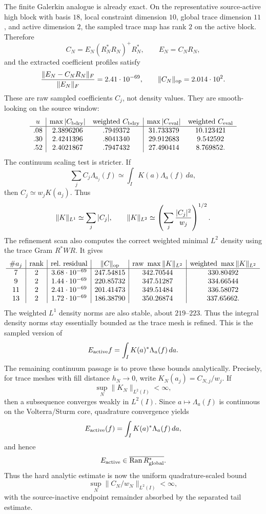 \documentclass[11pt]{article}
\begin{document}
The finite Galerkin analogue is already exact.  On the representative
source-active high block with basis \(18\), local constraint dimension \(10\),
global trace dimension \(11\), and active dimension \(2\), the sampled trace map
has rank \(2\) on the active block.  Therefore
\[
  C_N=E_N(R_N^\ast R_N)^+R_N^\ast,\qquad E_N=C_NR_N,
\]
and the extracted coefficient profiles satisfy
\[
  {\|E_N-C_NR_N\|_F\over\|E_N\|_F}=2.41\cdot10^{-69},
  \qquad \|C_N\|_{\rm op}=2.014\cdot10^2.
\]
These are raw sampled coefficients \(C_j\), not density values.  They are
smooth-looking on the source window:
\[
\begin{array}{c|cc|cc}
u&\max|C_{\rm bdry}|&{\rm weighted}\ C_{\rm bdry}
 &\max|C_{\rm eval}|&{\rm weighted}\ C_{\rm eval}\\\hline
.08&2.3896206&.7949372&31.733379&10.123421\\
.30&2.4241396&.8041340&29.912683& 9.542592\\
.52&2.4021867&.7947432&27.490414& 8.769852.
\end{array}
\]
The continuum scaling test is stricter.  If
\[
  \sum_j C_j\Lambda_{a_j}(f)\simeq
  \int_IK(a)\Lambda_a(f)\,da,
\]
then \(C_j\simeq w_jK(a_j)\).  Thus
\[
  \|K\|_{L^1}\simeq\sum_j|C_j|,\qquad
  \|K\|_{L^2}\simeq\left(\sum_j{|C_j|^2\over w_j}\right)^{1/2}.
\]
The refinement scan also computes the correct weighted minimal \(L^2\) density
using the trace Gram \(R^\ast W R\).  It gives
\[
\begin{array}{c|c|c|c|c|c}
\#a_j&{\rm rank}&{\rm rel.\ residual}&\|C\|_{\rm op}
 &{\rm raw}\ \max\|K\|_{L^2}
 &{\rm weighted}\ \max\|K\|_{L^2}\\\hline
7&2&3.68\cdot10^{-69}&247.54815&342.70544&330.80492\\
9&2&1.44\cdot10^{-69}&220.85732&347.51287&334.66544\\
11&2&2.41\cdot10^{-69}&201.41473&349.51484&336.58072\\
13&2&1.72\cdot10^{-69}&186.38790&350.26874&337.65662.
\end{array}
\]
The weighted \(L^1\) density norms are also stable, about \(219\)--\(223\).
Thus the integral density norms stay essentially bounded as the trace mesh is
refined.
This is the sampled version of
\[
  E_{\rm active}f=\int_I K(a)^\ast\Lambda_a(f)\,da.
\]
The remaining continuum passage is to prove these bounds analytically.
Precisely, for trace meshes with fill distance \(h_N\to0\), write
\(K_N(a_j)=C_{N,j}/w_j\).  If
\[
  \sup_N\|K_N\|_{L^2(I)}<\infty,
\]
then a subsequence converges weakly in \(L^2(I)\).  Since
\(a\mapsto\Lambda_a(f)\) is continuous on the Volterra/Sturm core, quadrature
convergence yields
\[
  E_{\rm active}(f)=\int_I K(a)^\ast\Lambda_a(f)\,da,
\]
and hence
\[
  E_{\rm active}\in
  \overline{\operatorname{Ran}R_{\rm global}^{\ast}}.
\]
Thus the hard analytic estimate is now the uniform quadrature-scaled bound
\[
  \sup_N \|C_N/w_N\|_{L^2(I)}<\infty,
\]
with the source-inactive endpoint remainder absorbed by the separated tail
estimate.
\end{document}
